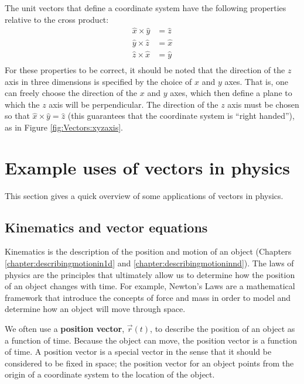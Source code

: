 
The unit vectors that define a coordinate system have the following properties relative to the cross product:
\begin{align*}
\hat x \times \hat y &= \hat z\\
\hat y \times \hat z &= \hat x\\
\hat z \times \hat x &= \hat y\\
\end{align*}
For these properties to be correct, it should be noted that the direction of the $z$ axis in three dimensions is specified by the choice of $x$ and $y$ axes. That is, one can freely choose the direction of the $x$ and $y$ axes, which then define a plane to which the $z$ axis will be perpendicular. The direction of the $z$ axis must be chosen so that $\hat x \times \hat y = \hat z$ (this guarantees that the coordinate system is ``right handed''), as in Figure \ref{fig:Vectors:xyzaxis}.

\section{Example uses of vectors in physics}
This section gives a quick overview of some applications of vectors in physics.
\subsection{Kinematics and vector equations}
Kinematics is the description of the position and motion of an object (Chapters \ref{chapter:describingmotionin1d} and \ref{chapter:describingmotioninnd}). The laws of physics are the principles that ultimately allow us to determine how the position of an object changes with time. For example, Newton's Laws are a mathematical framework that introduce the concepts of force and mass in order to model and determine how an object will move through space.

We often use a \textbf{position vector}, $\vec r(t)$, to describe the position of an object as a function of time. Because the object can move, the position vector is a function of time. A position vector is a special vector in the sense that it should be considered to be fixed in space; the position vector for an object points from the origin of a coordinate system to the location of the object. 

